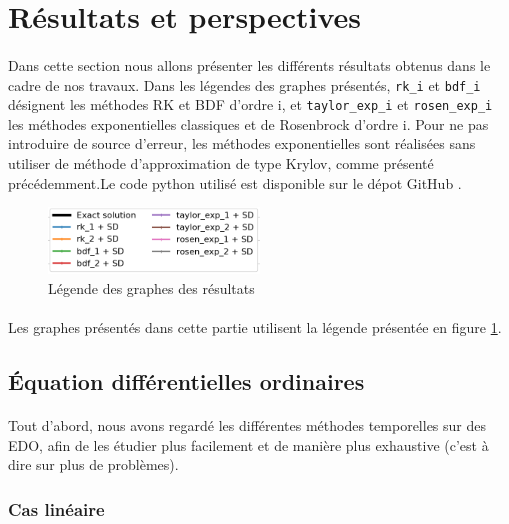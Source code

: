 \section{Résultats et perspectives}

\paragraph{}
Dans cette section nous allons présenter les différents résultats obtenus dans le cadre de nos travaux. Dans les légendes des graphes présentés, \texttt{rk\_i} et \texttt{bdf\_i} désignent les méthodes RK et BDF d'ordre i, et \texttt{taylor\_exp\_i} et \texttt{rosen\_exp\_i} les méthodes exponentielles classiques et de Rosenbrock d'ordre i. Pour ne pas introduire de source d'erreur, les méthodes exponentielles sont réalisées sans utiliser de méthode d'approximation de type Krylov, comme présenté précédemment.Le code python utilisé est disponible sur le dépot GitHub \cite{repo_git}.
\begin{figure}[h!]
    \centering
    \includegraphics[width=0.5\textwidth]{images/resultats/legend.png}
    \caption{Légende des graphes des résultats}
    \label{fig:legend}
\end{figure}

\paragraph{}
Les graphes présentés dans cette partie utilisent la légende présentée en figure \ref{fig:legend}.


\subsection{Équation différentielles ordinaires}

    \paragraph{}
    Tout d'abord, nous avons regardé les différentes méthodes temporelles sur des EDO, afin de les étudier plus facilement et de manière plus exhaustive (c'est à dire sur plus de problèmes).

    \subsubsection{Cas linéaire}
